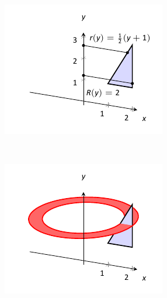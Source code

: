 \begin{solution}
{\begin{figure}[H]
	\centering
	\begin{subfigure}[t]{0.33\textwidth}
		\includegraphics[width=\textwidth]{figures/figwash2a}
		\label{fig:figwash2a}
		\caption{} 
	\end{subfigure}%
	~ 
	\begin{subfigure}[t]{0.33\textwidth}    
		\includegraphics[width=\textwidth]{figures/figwash2b}
		\label{fig:figwash2b}
		\caption{}    
	\end{subfigure}%
		~ 
		\begin{subfigure}[t]{0.33\textwidth}    

\end{subfigure}
\end{figure}}
\end{solution}

